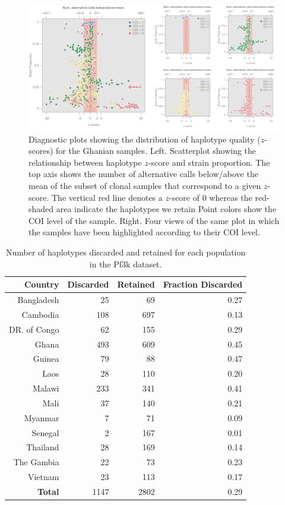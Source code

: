 \documentclass[9pt]{article}
\begin{document}
\begin{figure}[ht]
  \centering
    \includegraphics[width=1\textwidth]{figures/qualityGhana.pdf}
  \caption{Diagnostic plots showing the distribution of haplotype quality ($z$-scores) for the Ghanian samples. Left. Scatterplot showing the relationship between haplotype $z$-score and strain proportion. The top axis shows the number of alternative calls below/above the mean of the subset of clonal samples that correspond to a given $z$-score. The vertical red line denotes a $z$-score of $0$ whereas the red-shaded area indicate the haplotypes we retain Point colors show the COI level of the sample. Right. Four views of the same plot in which the samples have been highlighted according to their COI level.}
    \label{fig:ghana-filtering}
\end{figure}



\begin{table}[ht]
\centering
\begin{tabular}{r|r|r|r}
\textbf{Country}  & \textbf{Discarded} & \textbf{Retained} &\textbf{Fraction Discarded} \\
\hline
Bangladesh & 25 & 69 & 0.27 \\
Cambodia & 108 & 697 & 0.13 \\
DR. of Congo & 62 & 155 & 0.29 \\
Ghana & 493 & 609 & 0.45 \\
Guinea & 79 & 88 & 0.47 \\
Laos & 28 & 110 & 0.20 \\
Malawi & 233 & 341 & 0.41 \\
Mali & 37 & 140 & 0.21 \\
Myanmar & 7 & 71 & 0.09 \\
Senegal & 2 & 167 & 0.01\\
Thailand & 28 & 169 & 0.14 \\
The Gambia & 22 & 73 & 0.23 \\
Vietnam & 23 & 113 & 0.17\\
\hline
\textbf{Total} & 1147 & 2802 & 0.29
\end{tabular}
\vspace{.2cm}
\caption{Number of haplotypes discarded and retained for each population in the Pf3k dataset.}
\label{table:haps-discarded-by-country}
\end{table}
\end{document}
